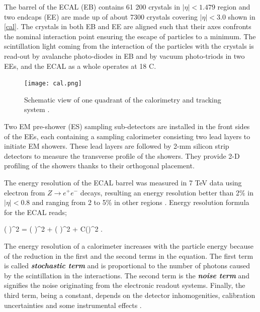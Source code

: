 The barrel of the ECAL (EB) contains 61 200 crystals in $|\eta|<1.479$ region and two endcaps (EE) are made up of about 7300 crystals covering $|\eta|<3.0$ shown in \autoref{cal}. The crystals in both EB and EE are aligned such that their axes confronts the nominal interaction point ensuring the escape of particles to a minimum. The scintillation light coming from the interaction of the particles with the crystals is read-out by avalanche photo-diodes in EB and by vacuum photo-triods in two EEs, and the ECAL as a whole operates at 18 \textdegree C.

\begin{figure}[ht]
	\centering
	\texttt{[image: cal.png]}
	\vspace{2mm}
	\caption[Schematic view showing one quadrant of the calorimetry and tracking system.]{Schematic view of one quadrant of the calorimetry and tracking system \cite{CERN-LHCC-97-033}.}
	\label{cal}
\end{figure}

Two EM pre-shower (ES) sampling sub-detectors are installed in the front sides of the EEs, each containing a sampling calorimeter consisting two lead layers to initiate EM showers. These lead layers are followed by 2-mm silicon strip detectors to measure the transverse profile of the showers. They provide 2-D profiling of the showers thanks to their orthogonal placement.

The energy resolution of the ECAL barrel was measured in 7 TeV data using electron from $Z \rightarrow e^+e^-$ decays, resulting an energy resolution better than 2\% in $|\eta|<0.8$ and ranging from 2 to 5\% in other regions \cite{ecalm}. Energy resolution formula for the ECAL reads;

\be
\left( \right)^2 = \left( \right)^2 + \left( \right)^2 + C\left(\eta\right)^2 \; .
\label{res_eq_ecal}
\ee

The energy resolution of a calorimeter increases with the particle energy because of the reduction in the first and the second terms in the equation. The first term is called \emph{\bf{stochastic term}} and is proportional to the number of photons caused by the scintillation in the interactions. The second term is the \emph{\bf{noise term}} and signifies the noise originating from the electronic readout systems. Finally, the third term, being a constant, depends on the detector inhomogenities, calibration uncertainties and some instrumental effects \cite{Ingram2007}.


